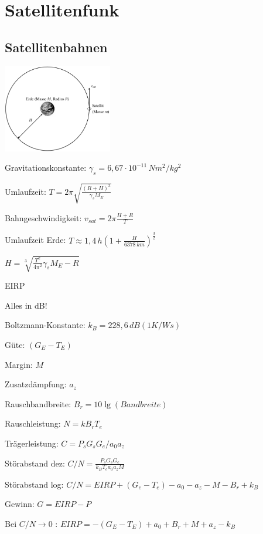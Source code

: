\documentclass[german]{latex4ei/latex4ei_sheet}
\begin{document}
\section{Satellitenfunk}
    \begin{sectionbox}{\subsection{Satellitenbahnen}}
       \item \includegraphics[width=180px]{img/Satellitenumlauf.png}
       \item Gravitationskonstante: $\gamma_s = 6,67\cdot 10^{-11}\, Nm^2/kg^2$
       \item Umlaufzeit: $T = 2\pi \sqrt{\frac{(R+H)^3}{\gamma_s M_E}}$
       \item Bahngeschwindigkeit: $v_{sat} = 2\pi \frac{H+R}{T}$
       \item Umlaufzeit Erde: $T \approx 1,4\,h \left( 1+\frac{H}{6378\,km}\right)^{\frac{3}{2}}$
       \item $H = \sqrt[3]{\frac{T^2}{4\pi^2}\gamma_s M_E - R}$
    \end{sectionbox}
    \begin{sectionbox}{EIRP}
        \item Alles in dB!
        \item Boltzmann-Konstante: $k_B = 228,6\,dB(1K/Ws)$
        \item Güte: $(G_E-T_E)$ 
        \item Margin: $M$
        \item Zusatzdämpfung: $a_z$
        \item Rauschbandbreite: $B_r = 10 \lg(Bandbreite)$
        \item Rauschleistung: $N = kB_rT_e$
        \item Trägerleistung: $C = P_s G_s G_e/a_0 a_z$
        \item Störabstand dez: $C/N = \frac{P_s G_s G_e}{k_B T_e a_0 a_z M}$
        \item Störabstand log: $C/N = EIRP + (G_e-T_e)-a_0-a_z-M-B_r+k_B$
        \item Gewinn: $G = EIRP - P$
        \item Bei $C/N\rightarrow 0$ : $EIRP = -(G_E-T_E) + a_0 + B_r + M + a_z - k_B$    
    \end{sectionbox}
\end{document}
